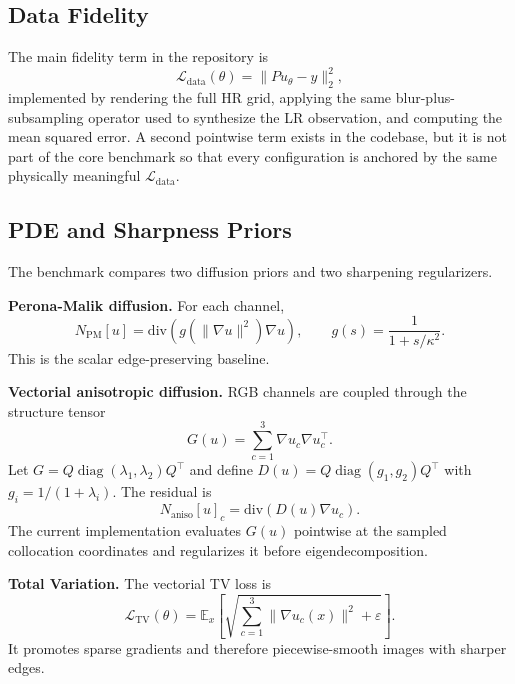 \documentclass[conference]{IEEEtran}
\newcommand{\grad}{\nabla}
\newcommand{\divg}{\mathrm{div}}
\newcommand{\loss}{\mathcal{L}}
\newcommand{\net}{u_{\theta}}
\begin{document}
\subsection{Data Fidelity}
The main fidelity term in the repository is
\begin{equation}
    \loss_{\mathrm{data}}(\theta) =
    \|P \net - y\|_2^2,
    \label{eq:data}
\end{equation}
implemented by rendering the full HR grid, applying the same
blur-plus-subsampling operator used to synthesize the LR observation,
and computing the mean squared error. A second pointwise term exists in
the codebase, but it is not part of the core benchmark so that every
configuration is anchored by the same physically meaningful
$\loss_{\mathrm{data}}$.

\subsection{PDE and Sharpness Priors}
The benchmark compares two diffusion priors and two sharpening
regularizers.

\textbf{Perona-Malik diffusion.} For each channel,
\begin{equation}
    N_{\mathrm{PM}}[u] =
    \divg\!\left(g(\|\grad u\|^2)\grad u\right), \qquad
    g(s) = \frac{1}{1 + s/\kappa^2}.
    \label{eq:pm}
\end{equation}
This is the scalar edge-preserving baseline.

\textbf{Vectorial anisotropic diffusion.} RGB channels are coupled
through the structure tensor
\begin{equation}
    G(u) = \sum_{c=1}^{3} \grad u_c \grad u_c^\top.
    \label{eq:structure}
\end{equation}
Let $G = Q \operatorname{diag}(\lambda_1,\lambda_2) Q^\top$ and define
$D(u) = Q \operatorname{diag}(g_1,g_2) Q^\top$ with
$g_i = 1/(1+\lambda_i)$. The residual is
\begin{equation}
    N_{\mathrm{aniso}}[u]_c = \divg\!\left(D(u)\grad u_c\right).
    \label{eq:aniso}
\end{equation}
The current implementation evaluates $G(u)$ pointwise at the sampled
collocation coordinates and regularizes it before eigendecomposition.

\textbf{Total Variation.} The vectorial TV loss is
\begin{equation}
    \loss_{\mathrm{TV}}(\theta) =
    \mathbb{E}_x \left[
    \sqrt{\sum_{c=1}^{3} \|\grad u_c(x)\|^2 + \varepsilon}
    \right].
    \label{eq:tv}
\end{equation}
It promotes sparse gradients and therefore piecewise-smooth images
with sharper edges.
\end{document}
